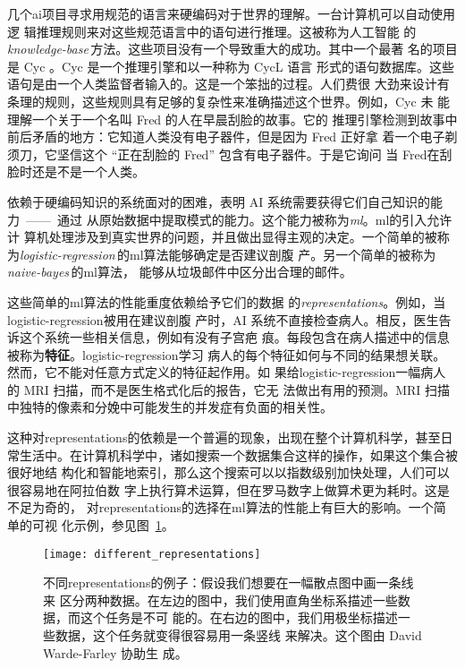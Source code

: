 几个\gls*{ai}项目寻求用规范的语言来硬编码对于世界的理解。一台计算机可以自动使用逻
辑推理规则来对这些规范语言中的语句进行推理。这被称为人工智能
的\emph{\gls{knowledge-base}}\,方法。这些项目没有一个导致重大的成功。其中一个最著
名的项目是 Cyc \citep{Lenat-1989-book}。Cyc 是一个推理引擎和以一种称为 CycL 语言
形式的语句数据库。这些语句是由一个人类监督者输入的。这是一个笨拙的过程。人们费很
大劲来设计有条理的规则，这些规则具有足够的复杂性来准确描述这个世界。例如，Cyc 未
能理解一个关于一个名叫 Fred 的人在早晨刮脸的故事\citep{MachineChangedWorld}。它的
推理引擎检测到故事中前后矛盾的地方：它知道人类没有电子器件，但是因为 Fred 正好拿
着一个电子剃须刀，它坚信这个 ``正在刮脸的 Fred'' 包含有电子器件。于是它询问
当 Fred在刮脸时还是不是一个人类。

依赖于硬编码知识的系统面对的困难，表明 AI 系统需要获得它们自己知识的能力~——~通过
从原始数据中提取模式的能力。这个能力被称为\emph{\gls{ml}}。\gls*{ml}的引入允许计
算机处理涉及到真实世界的问题，并且做出显得主观的决定。一个简单的被称
为\emph{\gls{logistic-regression}}\,的\gls*{ml}算法能够确定是否建议剖腹
产\citep{MorYosef90}。另一个简单的被称为\emph{\gls{naive-bayes}}\,的\gls*{ml}算法，
能够从垃圾邮件中区分出合理的邮件。

这些简单的\gls*{ml}算法的性能重度依赖给予它们的数据
的\emph{\gls{representations}}。例如，当\gls*{logistic-regression}被用在建议剖腹
产时，AI 系统不直接检查病人。相反，医生告诉这个系统一些相关信息，例如有没有子宫疤
痕。每段包含在病人描述中的信息被称为\textbf{特征}。\gls*{logistic-regression}学习
病人的每个特征如何与不同的结果想关联。然而，它不能对任意方式定义的特征起作用。如
果给\gls*{logistic-regression}一幅病人的 MRI 扫描，而不是医生格式化后的报告，它无
法做出有用的预测。MRI 扫描中独特的像素和分娩中可能发生的并发症有负面的相关性。

这种对\gls*{representations}的依赖是一个普遍的现象，出现在整个计算机科学，甚至日
常生活中。在计算机科学中，诸如搜索一个数据集合这样的操作，如果这个集合被很好地结
构化和智能地索引，那么这个搜索可以以指数级别加快处理，人们可以很容易地在阿拉伯数
字上执行算术运算，但在罗马数字上做算术更为耗时。这是不足为奇的，
对\gls*{representations}的选择在\gls*{ml}算法的性能上有巨大的影响。一个简单的可视
化示例，参见图~\ref{fig:different_representations}。

\begin{figure}[h]
  \centering
  \texttt{[image: different\_representations]}
  \caption{不同\gls*{representations}的例子：假设我们想要在一幅散点图中画一条线来
    区分两种数据。在左边的图中，我们使用直角坐标系描述一些数据，而这个任务是不可
    能的。在右边的图中，我们用极坐标描述一些数据，这个任务就变得很容易用一条竖线
    来解决。这个图由 David Warde-Farley 协助生
    成。\label{fig:different_representations}}
\end{figure}

